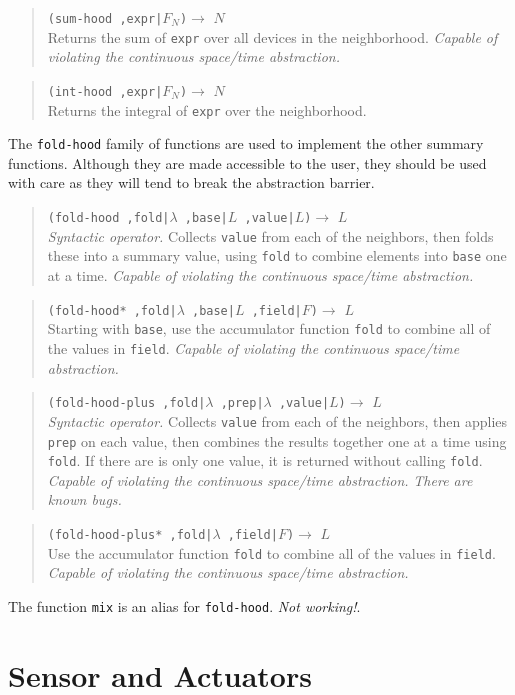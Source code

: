\documentclass{article}
\newcommand\broken{{\em Not working!}}
\newcommand\bugs{{\em There are known bugs.}}
\newcommand\violation{{\em Capable of violating the continuous
    space/time abstraction.}}
\newcommand\function[3]
{\begin{quote}{\tt #1}$\rightarrow$ \type{#2} \\ #3 \end{quote}}
\newcommand\syntactic[3]
{\function{#1}{#2}{{\em Syntactic operator.} #3}}
\newcommand\type[1]{$#1$}
\newcommand\var[1]{{\tt #1}}
\begin{document}
\function{(sum-hood ,expr|\type{F_N})}{N}{Returns the sum of
  \var{expr} over all devices in the neighborhood.  \violation{}}
\function{(int-hood ,expr|\type{F_N})}{N}{Returns the integral
  of \var{expr} over the neighborhood.}

The \var{fold-hood} family of functions are used to implement the
other summary functions.  Although they are made accessible to
the user, they should be used with care as they will tend to
break the abstraction barrier.

\syntactic{(fold-hood ,fold|\type{\lambda} ,base|\type{L}
  ,value|\type{L})}{L}{Collects \var{value} from each of the neighbors,
  then folds these into a summary value, using \var{fold} to combine
  elements into \var{base} one at a time. \violation{}}

\function{(fold-hood* ,fold|\type{\lambda} ,base|\type{L} 
  ,field|\type{F})}{L}{Starting with \var{base}, use the accumulator
  function \var{fold} to combine all of the values in \var{field}.
  \violation{}}

\syntactic{(fold-hood-plus ,fold|\type{\lambda} ,prep|\type{\lambda}
  ,value|\type{L})}{L}{Collects \var{value} from each of the
  neighbors, then applies \var{prep} on each value, then combines the
  results together one at a time using \var{fold}.  If there are is
  only one value, it is returned without calling \var{fold}.
  \violation{} \bugs{}}

\function{(fold-hood-plus* ,fold|\type{\lambda} ,field|\type{F})}{L}{
  Use the accumulator function \var{fold} to combine all of the values
  in \var{field}.  \violation{}}

The function \var{mix} is an alias for \var{fold-hood}. \broken{}.


\section{Sensor and Actuators}
\end{document}

